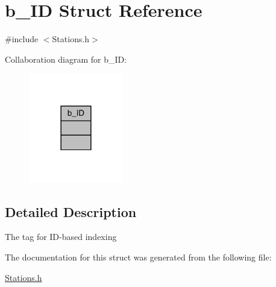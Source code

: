 \hypertarget{structb___i_d}{}\section{b\+\_\+\+ID Struct Reference}
\label{structb___i_d}


{\ttfamily \#include $<$Stations.\+h$>$}



Collaboration diagram for b\+\_\+\+ID\+:\nopagebreak
\begin{figure}[H]
\begin{center}
\leavevmode
\includegraphics[width=117pt]{structb___i_d__coll__graph}
\end{center}
\end{figure}


\subsection{Detailed Description}
The tag for I\+D-\/based indexing 

The documentation for this struct was generated from the following file\+:\begin{DoxyCompactItemize}
\item 
\mbox{\hyperlink{_stations_8h}{Stations.\+h}}\end{DoxyCompactItemize}

